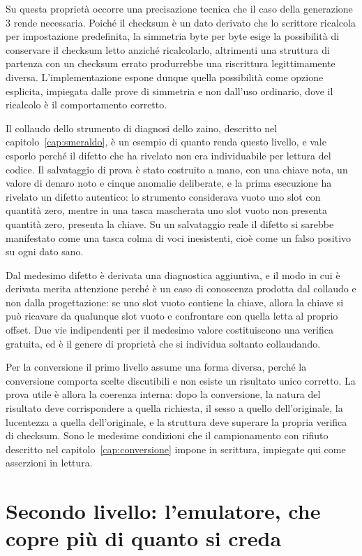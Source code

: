 Su questa proprietà occorre una precisazione tecnica che il caso della generazione 3 rende necessaria. Poiché il checksum è un dato derivato che lo scrittore ricalcola per impostazione predefinita, la simmetria byte per byte esige la possibilità di conservare il checksum letto anziché ricalcolarlo, altrimenti una struttura di partenza con un checksum errato produrrebbe una riscrittura legittimamente diversa. L'implementazione espone dunque quella possibilità come opzione esplicita, impiegata dalle prove di simmetria e non dall'uso ordinario, dove il ricalcolo è il comportamento corretto.

Il collaudo dello strumento di diagnosi dello zaino, descritto nel capitolo~\ref{cap:smeraldo}, è un esempio di quanto renda questo livello, e vale esporlo perché il difetto che ha rivelato non era individuabile per lettura del codice. Il salvataggio di prova è stato costruito a mano, con una chiave nota, un valore di denaro noto e cinque anomalie deliberate, e la prima esecuzione ha rivelato un difetto autentico: lo strumento considerava vuoto uno slot con quantità zero, mentre in una tasca mascherata uno slot vuoto non presenta quantità zero, presenta la chiave. Su un salvataggio reale il difetto si sarebbe manifestato come una tasca colma di voci inesistenti, cioè come un falso positivo su ogni dato sano.

Dal medesimo difetto è derivata una diagnostica aggiuntiva, e il modo in cui è derivata merita attenzione perché è un caso di conoscenza prodotta dal collaudo e non dalla progettazione: se uno slot vuoto contiene la chiave, allora la chiave si può ricavare da qualunque slot vuoto e confrontare con quella letta al proprio offset. Due vie indipendenti per il medesimo valore costituiscono una verifica gratuita, ed è il genere di proprietà che si individua soltanto collaudando.

Per la conversione il primo livello assume una forma diversa, perché la conversione comporta scelte discutibili e non esiste un risultato unico corretto. La prova utile è allora la coerenza interna: dopo la conversione, la natura del risultato deve corrispondere a quella richiesta, il sesso a quello dell'originale, la lucentezza a quella dell'originale, e la struttura deve superare la propria verifica di checksum. Sono le medesime condizioni che il campionamento con rifiuto descritto nel capitolo~\ref{cap:conversione} impone in scrittura, impiegate qui come asserzioni in lettura.

\section{Secondo livello: l'emulatore, che copre più di quanto si creda}

